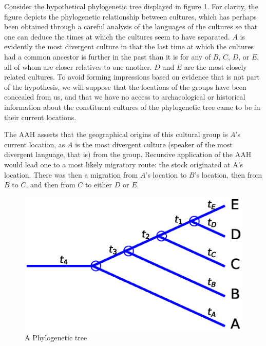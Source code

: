 \documentclass[11pt]{article}
\begin{document}
Consider the hypothetical phylogenetic tree displayed in figure \ref{fig1}. For clarity, the figure depicts the phylogenetic relationship between cultures, which has perhaps been obtained through a careful analysis of the languages of the cultures so that one can deduce the times at which the cultures seem to have separated. $A$ is evidently the most divergent culture in that the last time at which the cultures had a common ancestor is further in the past than it is for any of $B$, $C$, $D$, or $E$, all of whom are closer relatives to one another. $D$ and $E$ are the most closely related cultures. To avoid forming impressions based on evidence that is not part of the hypothesis, we will suppose that the locations of the
groups have been concealed from us, and that we have no access to archaeological or historical information about the constituent cultures of the phylogenetic tree came to be in their current locations.

The AAH asserts that the geographical origins of this cultural group is $A$'s current location, as $A$  is the most divergent culture (speaker of the most divergent language, that is) from the group. Recursive application of the AAH would lead one to a most likely migratory route: the stock originated at A's location. There was then a migration from $A$'s location to $B$'s location, then from $B$ to $C$, and then from $C$ to either $D$ or $E$.  

\begin{figure}
\begin{center}
\includegraphics[width=\textwidth]{AncillaryFiles//figure1.eps}
\caption{A Phylogenetic tree} \label{fig1}
\end{center} 
\end{figure}
\end{document}

